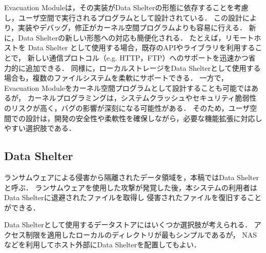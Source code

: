 Evacuation Moduleは，その実装がData Shelterの形態に依存することを考慮し，ユーザ空間で実行されるプログラムとして設計されている．
この設計により，実装やデバッグ，修正がカーネル空間プログラムよりも容易に行える．
新に，Data Shelterの新しい形態への対応も簡便化される．
たとえば，リモートホストを Data Shelter として使用する場合，既存のAPIやライブラリを利用することで，
新しい通信プロトコル（e.g. HTTP，FTP）へのサポートを迅速かつ省力的に追加できる．
同様に，ローカルストレージをData Shelterとして使用する場合も，複数のファイルシステムを柔軟にサポートできる．
一方で，Evacuation Moduleをカーネル空間プログラムとして設計することも可能ではあるが，
カーネルプログラミングは，システムクラッシュやセキュリティ脆弱性のリスクが高く，バグの影響が深刻になる可能性がある．
そのため，ユーザ空間での設計は，開発の安全性や柔軟性を確保しながら，必要な機能拡張に対応しやすい選択肢である．

\subsection{Data Shelter}
ランサムウェアによる侵害から隔離されたデータ領域を，本稿ではData Shelterと呼ぶ．
ランサムウェアを使用した攻撃が発覚した後，本システムの利用者はData Shelterに退避されたファイルを取得し
侵害されたファイルを復旧することができる．

Data Shelterとして使用するデータストアにはいくつか選択肢が考えられる．
アクセス制限を適用したローカルのディレクトリが最もシンプルであるが，
NASなどを利用してホスト外部にData Shelterを配置してもよい．
